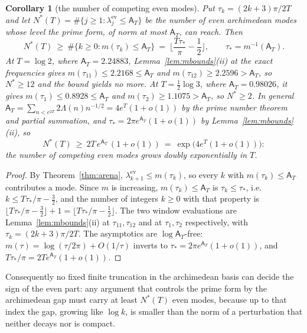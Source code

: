\documentclass[11pt]{amsart}
\newtheorem{corollary}[theorem]{Corollary}
\theoremstyle{definition}
\theoremstyle{remark}
\newcommand{\Aconst}{\mathsf A_T}
\begin{document}
\begin{corollary}[the number of competing even modes]\label{cor:arena}
Put $\tau_k=(2k+3)\pi/2T$ and let
$N^*(T)=\#\{j\ge1:\lambda^{\mathrm{ev}}_j\le\Aconst\}$ be the number of even archimedean modes
whose level the prime form, of norm at most $\Aconst$, can reach. Then
\[
N^*(T)\ \ge\ \#\{k\ge0:m(\tau_k)\le\Aconst\}\ =\ \Big\lfloor\frac{T\tau_*}{\pi}-\frac12\Big\rfloor,
\qquad \tau_*=m^{-1}(\Aconst).
\]
At $T=\log2$, where $\Aconst=2.24883$, Lemma~\ref{lem:mbounds}(ii) at the exact frequencies gives
$m(\tau_{11})\le2.2168\le\Aconst$ and $m(\tau_{12})\ge2.2596>\Aconst$, so $N^*\ge12$ and the
bound yields no more. At $T=\frac12\log3$, where $\Aconst=0.98026$, it gives
$m(\tau_1)\le0.8928\le\Aconst$ and $m(\tau_2)\ge1.1075>\Aconst$, so $N^*\ge2$. In general
$\Aconst=\sum_{n<e^{2T}}2\Lambda(n)n^{-1/2}=4e^{T}(1+o(1))$ by the prime number theorem and
partial summation, and $\tau_*=2\pi e^{\Aconst}(1+o(1))$ by Lemma~\ref{lem:mbounds}(ii), so
\[
N^*(T)\ \ge\ 2T\,e^{\Aconst}\,(1+o(1))\ =\ \exp\big(4e^{T}(1+o(1))\big):
\]
the number of competing even modes grows doubly exponentially in $T$.
\end{corollary}
\begin{proof}
By Theorem~\ref{thm:arena}, $\lambda^{\mathrm{ev}}_{k+1}\le m(\tau_k)$, so every $k$ with
$m(\tau_k)\le\Aconst$ contributes a mode. Since $m$ is increasing, $m(\tau_k)\le\Aconst$ is
$\tau_k\le\tau_*$, i.e.\ $k\le T\tau_*/\pi-\frac32$, and the number of integers $k\ge0$ with that
property is $\lfloor T\tau_*/\pi-\frac32\rfloor+1=\lfloor T\tau_*/\pi-\frac12\rfloor$. The two
window evaluations are Lemma~\ref{lem:mbounds}(ii) at $\tau_{11},\tau_{12}$ and at
$\tau_1,\tau_2$ respectively, with $\tau_k=(2k+3)\pi/2T$. The asymptotics are
$\log\Aconst$-free: $m(\tau)=\log(\tau/2\pi)+O(1/\tau)$ inverts to
$\tau_*=2\pi e^{\Aconst}(1+o(1))$, and $T\tau_*/\pi=2Te^{\Aconst}(1+o(1))$.
\end{proof}

Consequently no fixed finite truncation in the archimedean basis can decide the sign of the even
part: any argument that controls the prime form by the archimedean gap must carry at least $N^*(T)$
even modes, because up to that index the gap, growing like $\log k$, is smaller than the norm of a
perturbation that neither decays nor is compact.
\end{document}
